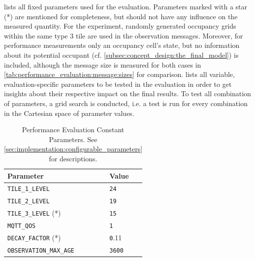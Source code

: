  lists all fixed parameters used for the evaluation. Parameters marked with a star (*) are mentioned for completeness, but should not have any influence on the measured quantity. For the experiment, randomly generated occupancy grids within the same type 3 tile are used in the observation messages. Moreover, for performance measurements only an occupancy cell's state, but no information about its potential occupant (cf. \cref{subsec:concept_design:the_final_model}) is included, although the message size is measured for both cases in \cref{tab:performance_evaluation:message:sizes} for comparison.  lists all variable, evaluation-specific parameters to be tested in the evaluation in order to get insights about their respective impact on the final results. To test all combination of parameters, a grid search is conducted, i.e. a test is run for every combination in the Cartesian space of parameter values. 

\begin{table}
	\centering
	\begin{tabular}{|p{4.5cm}|p{2cm}|}
		\hline 
		\textbf{Parameter} & \textbf{Value} \\ \hline 
		\texttt{TILE\_1\_LEVEL} & \texttt{24} \\ \hline 
		\texttt{TILE\_2\_LEVEL} & \texttt{19} \\ \hline 
		\texttt{TILE\_3\_LEVEL} (*) & \texttt{15} \\ \hline 
		\texttt{MQTT\_QOS} & \texttt{1} \\ \hline 
		\texttt{DECAY\_FACTOR} (*) & \texttt{0}.11 \\ \hline 
		\texttt{OBSERVATION\_MAX\_AGE} & \texttt{3600} \\ \hline 
	\end{tabular}
	\caption[Performance Evaluation Constant Parameters]{Performance Evaluation Constant Parameters. See \cref{sec:implementation:configurable_parameters} for descriptions.}
	\label{tab:performance_evaluation:constant_parameters}
\end{table}

